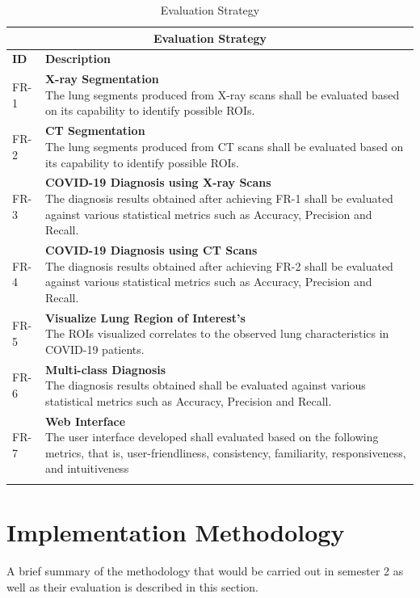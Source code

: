 \begin{longtable}{| p{} | p{} |} 
\hline
\multicolumn{2}{|c|}{\textbf{Evaluation Strategy}}\\
\hline
\textbf{ID} & \textbf{Description}\\
\hline
FR-1 & \parbox[t]{12.3cm}{\textbf{X-ray Segmentation} \\ The lung segments produced from X-ray scans shall be evaluated based on its capability to identify possible ROIs.}\\\hline
FR-2 & \parbox[t]{12.3cm}{\textbf{CT Segmentation} \\ The lung segments produced from CT scans shall be evaluated based on its capability to identify possible ROIs.}\\\hline
FR-3 & \parbox[t]{12.3cm}{\textbf{COVID-19 Diagnosis using X-ray Scans} \\ The diagnosis results obtained after achieving FR-1 shall be evaluated against various statistical metrics such as Accuracy, Precision and Recall.}\\\hline
FR-4 & \parbox[t]{12.3cm}{\textbf{COVID-19 Diagnosis using CT Scans} \\ The diagnosis results obtained after achieving FR-2 shall be evaluated against various statistical metrics such as Accuracy, Precision and Recall.}\\\hline
FR-5 & \parbox[t]{12.3cm}{\textbf{Visualize Lung Region of Interest's} \\ The ROIs visualized correlates to the observed lung characteristics in COVID-19 patients.} \\\hline
FR-6 & \parbox[t]{12.3cm}{\textbf{Multi-class Diagnosis} \\ The diagnosis results obtained shall be evaluated against various statistical metrics such as Accuracy, Precision and Recall.}\\\hline
FR-7 & \parbox[t]{12.3cm}{\textbf{Web Interface} \\ The user interface developed shall evaluated based on the following metrics, that is, user-friendliness, consistency, familiarity, responsiveness, and intuitiveness\vspace{0.2em}}\\\hline
\caption{Evaluation Strategy}

  \label{tab:Evaluation Strategy}
  \end{longtable}
  
    \vspace{-2em}
\section{Implementation Methodology}
A brief summary of the methodology that would be carried out in semester 2 as well as their evaluation is described in this section.
